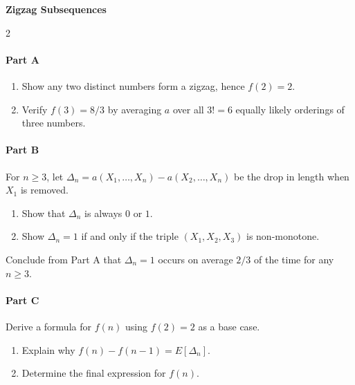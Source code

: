 \begin{exer*}{\Large{\textbf{\hspace{3.86cm}Zigzag Subsequences}}}
\begin{multicols}{2}
\begin{center}
\end{center}
\end{multicols}
\paragraph{Part A} 
\begin{enumerate}[nosep, leftmargin=*]
    \item Show any two distinct numbers form a zigzag, hence $f(2) = 2$.
    \item Verify $f(3) = 8/3$ by averaging $a$ over all $3! = 6$ equally likely orderings of three numbers.
\end{enumerate}

\paragraph{Part B} For $n \ge 3$, let $\Delta_n = a(X_1, \dots, X_n) - a(X_2, \dots, X_n)$ be the drop in length when $X_1$ is removed.
\begin{enumerate}[label=(\roman*), nosep, leftmargin=*]
    \item Show that $\Delta_n$ is always $0$ or $1$.
    \item Show $\Delta_n = 1$ if and only if the triple $(X_1, X_2, X_3)$ is non-monotone.
\end{enumerate}
Conclude from Part A that $\Delta_n = 1$ occurs on average $2/3$ of the time for any $n \ge 3$.

\paragraph{Part C} Derive a formula for $f(n)$ using $f(2)=2$ as a base case.
\begin{enumerate}[label=(\roman*), nosep, leftmargin=*]
    \item Explain why $f(n) - f(n-1) = E[\Delta_n]$.
    \item Determine the final expression for $f(n)$.
\end{enumerate}


\end{exer*}



